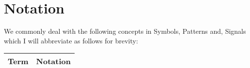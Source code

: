 \section{Notation}

We commonly deal with the following concepts in 
Symbols, Patterns and, Signals
which I will abbreviate as follows for brevity:
\begin{center}
    \begin{tabular}{ | r | c | }
        \hline
        Term & Notation \\
        \hline \hline
        \hline
    \end{tabular}
\end{center}